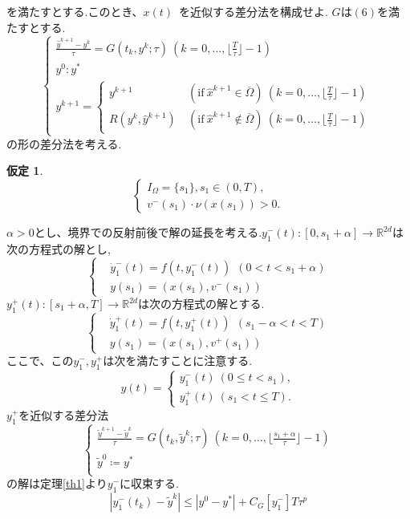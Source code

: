 \documentclass[a4,12pt]{article}
\newtheorem{hyp}{仮定}
\begin{document}
を満たすとする.このとき、$x(t)$ を近似する差分法を構成せよ.
$G$は$(6)$を満たすとする.
\begin{equation}
\begin{cases}
\displaystyle\frac{\hat{y}^{k+1}-y^k}{\tau}=G(t_k,y^k;\tau)\ (k=0,\ldots ,\lfloor\frac{T}{\tau}\rfloor-1)\\
y^0:y^*\\
y^{k+1}=
\begin{cases}
y^{k+1}\ &(\text{if}\ \hat{x}^{k+1}\in\overline{\Omega})\ (k=0,\ldots ,\lfloor\frac{T}{\tau}\rfloor-1)\\
R(y^k,\hat{y}^{k+1})\ &(\text{if}\ \hat{x}^{k+1}\notin\overline{\Omega})\ (k=0,\ldots ,\lfloor\frac{T}{\tau}\rfloor-1)
\end{cases}
\end{cases}
\end{equation}
の形の差分法を考える.
\begin{hyp}
\[\begin{cases}
I_{\Omega}= \{s_1\},s_1\in (0,T),\\
v^{-}(s_1)\cdot\nu(x(s_1))>0.
\end{cases}\]
\end{hyp}
\medskip
$\alpha>0$とし、境界での反射前後で解の延長を考える.$y^{-}_1(t):[0,s_1+\alpha]\rightarrow\mathbb{R}^{2d}$は次の方程式の解とし,
\begin{equation}\left\{\begin{aligned}
    &\dot{y}^{-}_1(t)=f(t,y^{-}_1(t))\ \ (0<t<s_1+\alpha)\\
    &y(s_1)=(x(s_1),v^{-}(s_1))
    \end{aligned}\right.
\end{equation}
$y^{+}_1(t):[s_1+\alpha,T]\rightarrow\mathbb{R}^{2d}$は次の方程式の解とする.
\begin{equation}\left\{\begin{aligned}
    &\dot{y}^{+}_1(t)=f(t,y^{+}_1(t))\ \ (s_1-\alpha<t<T)\\
    &y(s_1)=(x(s_1),v^{+}(s_1))
    \end{aligned}\right.
\end{equation}
ここで、この$y^-_1,y^+_1$は次を満たすことに注意する.
\[y(t)=
\begin{cases}
y^{-}_1(t)\ (0\leq t<s_1),\\
y^{+}_1(t)\ (s_1<t\leq T).
\end{cases}
\]
$y^+_1$を近似する差分法
\[\begin{cases}
\displaystyle\frac{\tilde{y}^{k+1}-\tilde{y}^k}{\tau}=G(t_k,\tilde{y}^k;\tau)\ (k=0,\ldots ,\lfloor\frac{s_1+\alpha}{\tau}\rfloor-1)\\
\tilde{y}^0\coloneqq y^*\\
\end{cases}\]
の解は定理\ref{th1}より$y^-_1$に収束する.
\begin{equation}
    |y^-_1(t_k)-\tilde{y}^k|\le |y^0-y^\ast|+C_G[y^-_1]T\tau^p
\end{equation}
    
\end{document}
